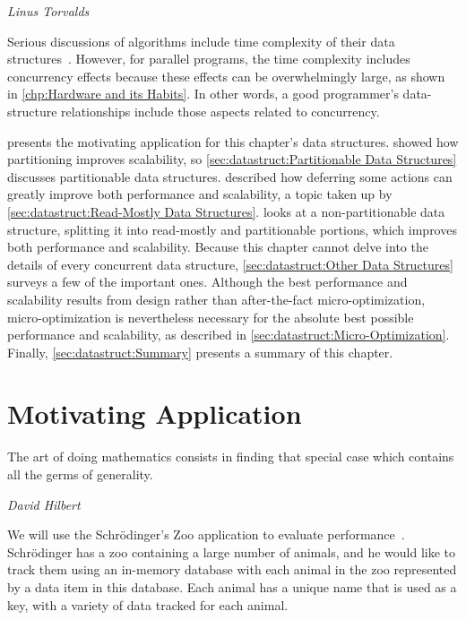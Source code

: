 
%
	 {\emph{Linus Torvalds}}

Serious discussions of algorithms include time complexity of their
data structures~\cite{ThomasHCorman2001Algorithms}.
However, for parallel programs, the time complexity includes concurrency
effects because these effects can be overwhelmingly large, as shown in
\cref{chp:Hardware and its Habits}.
In other words, a good programmer's data-structure relationships
include those aspects related to concurrency.

presents the motivating application for this chapter's data structures.
 showed how
partitioning improves scalability, so
\cref{sec:datastruct:Partitionable Data Structures}
discusses partitionable data structures.
 described how deferring some
actions can greatly improve both performance and scalability,
a topic taken up by
\cref{sec:datastruct:Read-Mostly Data Structures}.
looks at a non-partitionable data structure, splitting
it into read-mostly and partitionable portions,
which improves both performance and scalability.
Because this chapter cannot delve into the details of every concurrent
data structure,
\cref{sec:datastruct:Other Data Structures}
surveys a few  of the important ones.
Although the best performance and scalability results from design rather
than after-the-fact micro-optimization, micro-optimization is nevertheless
necessary for the absolute best possible performance and scalability,
as described in
\cref{sec:datastruct:Micro-Optimization}.
Finally, \cref{sec:datastruct:Summary}
presents a summary of this chapter.

\section{Motivating Application}
\label{sec:datastruct:Motivating Application}
%
\epigraph{The art of doing mathematics consists in finding that special
	  case which contains all the germs of generality.}
	 {\emph{David Hilbert}}

We will use the Schr\"odinger's Zoo application to evaluate
performance~\cite{McKenney:2013:SDS:2483852.2483867}.
Schr\"odinger has a zoo containing a large number of animals, and
he would like to track them using an in-memory database with
each animal in the zoo represented by a data item in this database.
Each animal has a unique name that is used as a key, with a variety
of data tracked for each animal.

